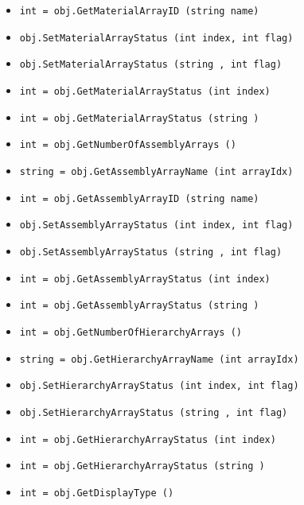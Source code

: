 \begin{itemize}
\item  \verb|int = obj.GetMaterialArrayID (string name)|

\item  \verb|obj.SetMaterialArrayStatus (int index, int flag)|

\item  \verb|obj.SetMaterialArrayStatus (string , int flag)|

\item  \verb|int = obj.GetMaterialArrayStatus (int index)|

\item  \verb|int = obj.GetMaterialArrayStatus (string )|

\item  \verb|int = obj.GetNumberOfAssemblyArrays ()|

\item  \verb|string = obj.GetAssemblyArrayName (int arrayIdx)|

\item  \verb|int = obj.GetAssemblyArrayID (string name)|

\item  \verb|obj.SetAssemblyArrayStatus (int index, int flag)|

\item  \verb|obj.SetAssemblyArrayStatus (string , int flag)|

\item  \verb|int = obj.GetAssemblyArrayStatus (int index)|

\item  \verb|int = obj.GetAssemblyArrayStatus (string )|

\item  \verb|int = obj.GetNumberOfHierarchyArrays ()|

\item  \verb|string = obj.GetHierarchyArrayName (int arrayIdx)|

\item  \verb|obj.SetHierarchyArrayStatus (int index, int flag)|

\item  \verb|obj.SetHierarchyArrayStatus (string , int flag)|

\item  \verb|int = obj.GetHierarchyArrayStatus (int index)|

\item  \verb|int = obj.GetHierarchyArrayStatus (string )|

\item  \verb|int = obj.GetDisplayType ()|


\end{itemize}
